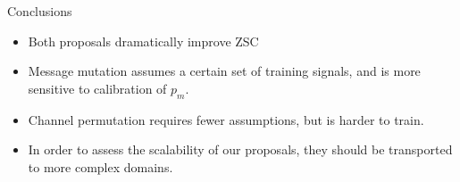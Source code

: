 \begin{frame}{Conclusions}
    
    \begin{itemize}
        \item Both proposals dramatically improve ZSC
        \item Message mutation assumes a certain set of training signals, and is more sensitive to calibration of $p_m$.
        \item Channel permutation requires fewer assumptions, but is harder to train.
        \item In order to assess the scalability of our proposals, they should be transported to more complex domains. %
    \end{itemize}
\end{frame}